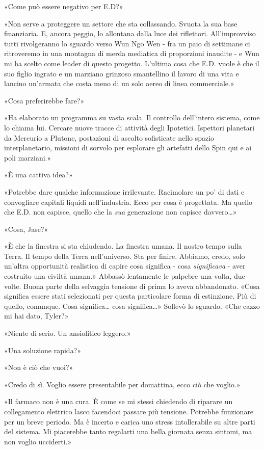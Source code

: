 «Come può essere negativo per E.D?»

«Non serve a proteggere un settore che sta collassando. Svuota la sua
base finanziaria. E, ancora peggio, lo allontana dalla luce dei
riflettori. All'improvviso tutti rivolgeranno lo sguardo verso Wun Ngo
Wen - fra un paio di settimane ci ritroveremo in una montagna di merda
mediatica di proporzioni inaudite - e Wun mi ha scelto come leader di
questo progetto. L'ultima cosa che E.D. vuole è che il suo figlio
ingrato e un marziano grinzoso smantellino il lavoro di una vita e
lancino un'armata che costa meno di un solo aereo di linea commerciale.»

«Cosa preferirebbe fare?»

«Ha elaborato un programma su vasta scala. Il controllo dell'intero
sistema, come lo chiama lui. Cercare nuove tracce di attività degli
Ipotetici. Ispettori planetari da Mercurio a Plutone, postazioni di
ascolto sofisticate nello spazio interplanetario, missioni di sorvolo
per esplorare gli artefatti dello Spin qui e ai poli marziani.»

«È una cattiva idea?»

«Potrebbe dare qualche informazione irrilevante. Racimolare un po' di
dati e convogliare capitali liquidi nell'industria. Ecco per cosa è
progettata. Ma quello che E.D. non capisce, quello che la \emph{sua}
generazione non capisce davvero\ldots»

«Cosa, Jase?»

«È che la finestra si sta chiudendo. La finestra umana. Il nostro tempo
sulla Terra. Il tempo della Terra nell'universo. Sta per finire.
Abbiamo, credo, solo un'altra opportunità realistica di capire cosa
significa - cosa \emph{significava} - aver costruito una civiltà umana.»
Abbassò lentamente le palpebre una volta, due volte. Buona parte della
selvaggia tensione di prima lo aveva abbandonato. «Cosa significa essere
stati selezionati per questa particolare forma di estinzione. Più di
quello, comunque. Cosa significa\ldots{} cosa significa\ldots» Sollevò
lo sguardo. «Che cazzo mi hai dato, Tyler?»

«Niente di serio. Un ansiolitico leggero.»

«Una soluzione rapida?»

«Non è ciò che vuoi?»

«Credo di sì. Voglio essere presentabile per domattina, ecco ciò che
voglio.»

«Il farmaco non è una cura. È come se mi stessi chiedendo di riparare un
collegamento elettrico lasco facendoci passare più tensione. Potrebbe
funzionare per un breve periodo. Ma è incerto e carica uno stress
intollerabile su altre parti del sistema. Mi piacerebbe tanto regalarti
una bella giornata senza sintomi, ma non voglio ucciderti.»

